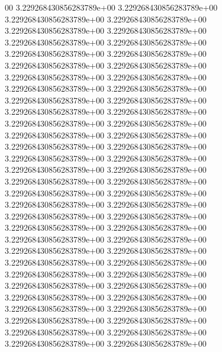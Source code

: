 00	3.229268430856283789e+00	3.229268430856283789e+00	3.229268430856283789e+00	3.229268430856283789e+00	3.229268430856283789e+00	3.229268430856283789e+00	3.229268430856283789e+00	3.229268430856283789e+00	3.229268430856283789e+00	3.229268430856283789e+00	3.229268430856283789e+00	3.229268430856283789e+00	3.229268430856283789e+00	3.229268430856283789e+00	3.229268430856283789e+00	3.229268430856283789e+00	3.229268430856283789e+00	3.229268430856283789e+00	3.229268430856283789e+00	3.229268430856283789e+00	3.229268430856283789e+00	3.229268430856283789e+00	3.229268430856283789e+00	3.229268430856283789e+00	3.229268430856283789e+00	3.229268430856283789e+00	3.229268430856283789e+00	3.229268430856283789e+00	3.229268430856283789e+00	3.229268430856283789e+00	3.229268430856283789e+00	3.229268430856283789e+00	3.229268430856283789e+00	3.229268430856283789e+00	3.229268430856283789e+00	3.229268430856283789e+00	3.229268430856283789e+00	3.229268430856283789e+00	3.229268430856283789e+00	3.229268430856283789e+00	3.229268430856283789e+00	3.229268430856283789e+00	3.229268430856283789e+00	3.229268430856283789e+00	3.229268430856283789e+00	3.229268430856283789e+00	3.229268430856283789e+00	3.229268430856283789e+00	3.229268430856283789e+00	3.229268430856283789e+00	3.229268430856283789e+00	3.229268430856283789e+00	3.229268430856283789e+00	3.229268430856283789e+00	3.229268430856283789e+00	3.229268430856283789e+00	3.229268430856283789e+00	3.229268430856283789e+00	3.229268430856283789e+00	3.229268430856283789e+00
